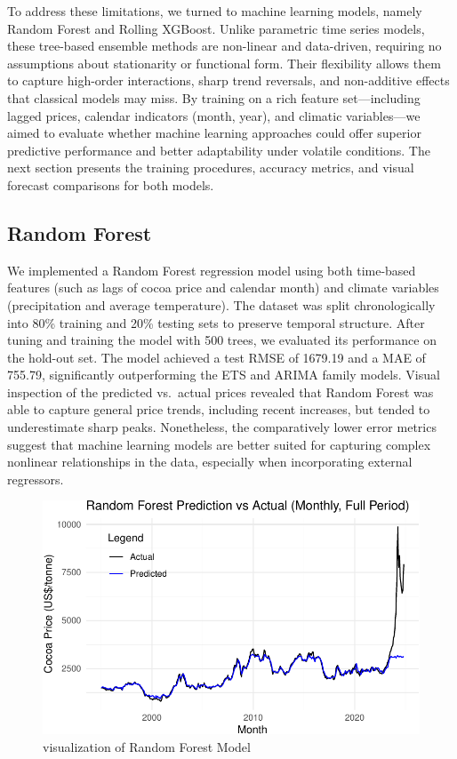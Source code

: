 \documentclass[
  letterpaper,
  DIV=11,
  numbers=noendperiod]{scrartcl}
\begin{document}
To address these limitations, we turned to machine learning models,
namely Random Forest and Rolling XGBoost. Unlike parametric time series
models, these tree-based ensemble methods are non-linear and
data-driven, requiring no assumptions about stationarity or functional
form. Their flexibility allows them to capture high-order interactions,
sharp trend reversals, and non-additive effects that classical models
may miss. By training on a rich feature set---including lagged prices,
calendar indicators (month, year), and climatic variables---we aimed to
evaluate whether machine learning approaches could offer superior
predictive performance and better adaptability under volatile
conditions. The next section presents the training procedures, accuracy
metrics, and visual forecast comparisons for both models.

\hypertarget{random-forest}{%
\subsection{Random Forest}\label{random-forest}}

We implemented a Random Forest regression model using both time-based
features (such as lags of cocoa price and calendar month) and climate
variables (precipitation and average temperature). The dataset was split
chronologically into 80\% training and 20\% testing sets to preserve
temporal structure. After tuning and training the model with 500 trees,
we evaluated its performance on the hold-out set. The model achieved a
test RMSE of 1679.19 and a MAE of 755.79, significantly outperforming
the ETS and ARIMA family models. Visual inspection of the predicted
vs.~actual prices revealed that Random Forest was able to capture
general price trends, including recent increases, but tended to
underestimate sharp peaks. Nonetheless, the comparatively lower error
metrics suggest that machine learning models are better suited for
capturing complex nonlinear relationships in the data, especially when
incorporating external regressors.

\begin{figure}

{\centering \includegraphics{STA457_Project_files/figure-pdf/fig-rf-full-fit-3-1.pdf}

}

\caption{\label{fig-rf-full-fit-3}visualization of Random Forest Model}

\end{figure}
\end{document}
